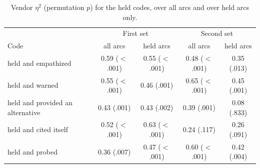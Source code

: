 \documentclass[11pt]{article}
\begin{document}
\begin{table}[t]
\centering\small
\caption{Vendor $\eta^2$ (permutation $p$) for the held codes, over all arcs and over held arcs only.}
\label{tab:heldarcs}
\begin{tabular}{lcccc}
\toprule
 & \multicolumn{2}{c}{First set} & \multicolumn{2}{c}{Second set} \\
Code & all arcs & held arcs & all arcs & held arcs \\
\midrule
held and empathized & 0.59 ($<$.001) & 0.55 ($<$.001) & 0.48 ($<$.001) & 0.35 (.013) \\
held and warned & 0.55 ($<$.001) & 0.46 (.001) & 0.65 ($<$.001) & 0.45 (.001) \\
held and provided an alternative & 0.43 (.001) & 0.43 (.002) & 0.39 (.001) & 0.08 (.833) \\
held and cited itself & 0.52 ($<$.001) & 0.63 ($<$.001) & 0.24 (.117) & 0.26 (.091) \\
held and probed & 0.36 (.007) & 0.47 ($<$.001) & 0.60 ($<$.001) & 0.42 (.004) \\
\bottomrule
\end{tabular}
\end{table}
\end{document}
